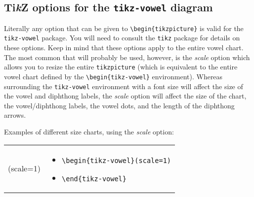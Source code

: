 \documentclass{article}
\newcommand{\TikZ}{Ti\textit{k}Z\xspace}
\newcommand{\pkg}[1]{\texttt{#1}}
\begin{document}
\subsection{\TikZ options for the \pkg{tikz-vowel} diagram}
\label{sec:TikZ options for the tikz-vowel diagram}

Literally any option that can be given to \verb|\begin{tikzpicture}| is valid for the \pkg{tikz-vowel} package.  You will need to consult the \pkg{tikz} package for details on these options.  Keep in mind that these options apply to the entire vowel chart.  The most common that will probably be used, however, is the \textit{scale} option which allows you to resize the entire \texttt{tikzpicture} (which is equivalent to the entire vowel chart defined by the \verb+\begin{tikz-vowel}+ environment).  Whereas surrounding the \texttt{tikz-vowel} environment with a font size will affect the size of the vowel and diphthong labels, the \textit{scale} option will affect the size of the chart, the vowel/diphthong labels, the vowel dots, and the length of the diphthong arrows.

\bigskip
\noindent
Examples of different size charts, using the \textit{scale} option:

\begin{center}
\begin{tabular}{rl}
  \begin{minipage}[t]{0.45\textwidth}
  \centering
	\begin{tikz-vowel}(scale=1)
	\end{tikz-vowel}
  \end{minipage} &
  \begin{minipage}[t]{0.2\textwidth}
  \vspace{-65pt}
  {\small
\begin{itemize}[label={}]
	\item \verb|\begin{tikz-vowel}(scale=1)|
	\item \verb|\end{tikz-vowel}|
\end{itemize}
    }
  \end{minipage}\\
\end{tabular}
\end{center}
\end{document}
